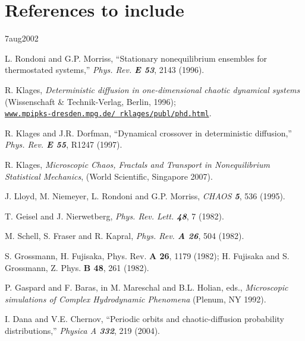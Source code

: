 \section{References to include}

{ 7aug2002}


  L. Rondoni and G.P. Morriss,
	``Stationary nonequilibrium ensembles for thermostated systems,''
	{\em Phys. Rev. \bf E 53}, 2143 (1996).


 R. Klages,
	{\em Deterministic diffusion in one-dimensional chaotic
	dynamical systems} (Wissenschaft \& Technik-Verlag, Berlin, 1996);
    \\
	{\tt \href{http://www.mpipks-dresden.mpg.de/~rklages/publ/phd.html}
	          {www.mpipks-dresden.mpg.de/~rklages/publ/phd.html}}.

 R. Klages and J.R. Dorfman,
	``Dynamical crossover in deterministic diffusion,''
	{\em Phys. Rev. \bf E 55}, R1247 (1997). %


 R. Klages,
    {\em Microscopic Chaos, Fractals and Transport
     in Nonequilibrium Statistical Mechanics},
     (World Scientific, Singapore 2007).

  J. Lloyd, M. Niemeyer, L. Rondoni and G.P. Morriss,
	{\em CHAOS \bf  5}, 536 (1995).

 T. Geisel and J. Nierwetberg,
	{\em Phys. Rev. Lett. \bf 48}, 7 (1982).

 M. Schell, S. Fraser and R. Kapral,
	{\em Phys. Rev. \bf A 26}, 504 (1982).

 S. Grossmann, H. Fujisaka,
	{Phys. Rev. \bf A 26}, 1179 (1982);
	H. Fujisaka and S. Grossmann, {Z. Phys. \bf B 48}, 261 (1982).

 P. Gaspard and F. Baras, in
	M. Mareschal and B.L. Holian, eds.,
	{\em Microscopic simulations of Complex Hydrodynamic
	Phenomena} (Plenum, NY 1992).

 I. Dana and V.E. Chernov,
	``Periodic orbits and chaotic-diffusion
	 probability distributions,''
	{\em Physica A \bf 332}, 219 (2004). %


